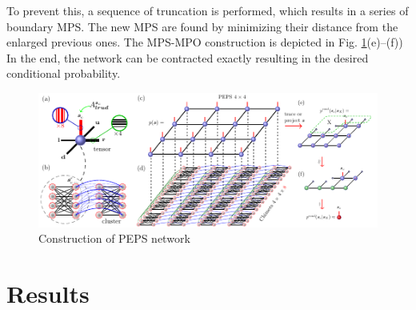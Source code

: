 To prevent this, a sequence of truncation is performed, which results in a series of boundary
MPS. The new MPS are found by minimizing their distance from the enlarged previous ones.
The MPS-MPO construction is depicted in Fig. \ref{fig:tensors}(e)--(f))
In the end, the network can be contracted exactly resulting in the desired conditional probability.
\begin{figure}
  \includegraphics[width=\textwidth]{figures/peps.pdf}
  \caption{Construction of PEPS network} \label{fig:tensors}
\end{figure}

\section{Results}

